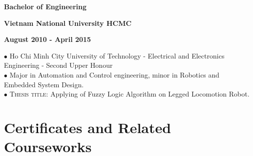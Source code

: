 \documentclass[10pt]{article}
\begin{document}
        \begin{multicols}{3}
            \begin{flushleft}
                \textbf{Bachelor of Engineering}
            \end{flushleft}

            \columnbreak

            \begin{center}
                \textbf{Vietnam National University HCMC}
            \end{center}

            \columnbreak

            \begin{flushright}
                \textbf{August 2010 - April 2015}
            \end{flushright}
        \end{multicols}

        \vspace{-5mm}

        $\bullet$ {Ho Chi Minh City University of Technology - Electrical and Electronics Engineering - Second Upper Honour} \\
        $\bullet$ {Major in Automation and Control engineering, minor in Robotics and Embedded System Design.} \\
        $\bullet$ \textsc{Thesis title}: Applying of Fuzzy Logic Algorithm on Legged Locomotion Robot.

    \section{Certificates and Related Courseworks}
        \vspace{-2mm}
\end{document}
